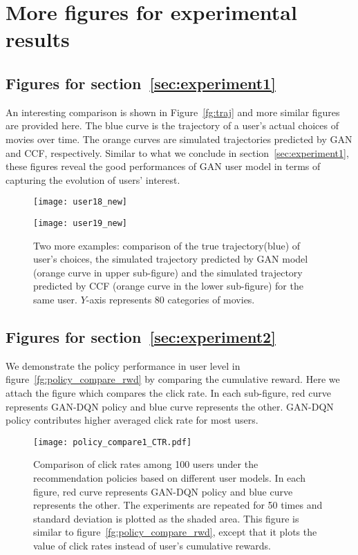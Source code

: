 \documentclass{article} %
\begin{document}
\section{More figures for experimental results}\label{app:experiment}
\subsection{Figures for section~\ref{sec:experiment1}}\label{app:exp_usermodel}
An interesting comparison is shown in Figure~\ref{fg:traj} and more similar figures are provided here. The blue curve is the trajectory of a user's actual choices of movies over time. The orange curves are simulated trajectories predicted by GAN and CCF, respectively. Similar to what we conclude in section~\ref{sec:experiment1}, these figures reveal the good performances of GAN user model in terms of capturing the evolution of users' interest.
\begin{figure}[htbp]
  \begin{minipage}[c]{0.47\textwidth}
    \centering
    \texttt{[image: user18\_new]}
  \end{minipage}\hfill
  \begin{minipage}[c]{0.52\textwidth}
    \centering
        \texttt{[image: user19\_new]}
  \end{minipage}
  \caption{\small Two more examples: comparison of the true trajectory(blue) of user's choices, the simulated trajectory predicted by GAN model (orange curve in upper sub-figure) and the simulated trajectory predicted by CCF (orange curve in the lower sub-figure) for the same user. $Y$-axis represents 80 categories of movies.
    }
\end{figure}


\subsection{Figures for section~\ref{sec:experiment2}}\label{app:exp_policy2}
 We demonstrate the policy performance in user level in figure~\ref{fg:policy_compare_rwd} by comparing the cumulative reward. Here we attach the figure which compares the click rate. In each sub-figure, red curve represents GAN-DQN policy and blue curve represents the other. GAN-DQN policy contributes higher averaged click rate for most users.
\begin{figure}[ht!]
\centering
\texttt{[image: policy\_compare1\_CTR.pdf]}
\caption{\small Comparison of click rates among 100 users under the recommendation policies based on different user models. In each figure, red curve represents GAN-DQN policy and blue curve represents the other. The experiments are repeated for 50 times and standard deviation is plotted as the shaded area. This figure is similar to figure~\ref{fg:policy_compare_rwd}, except that it plots the value of click rates instead of user's cumulative rewards.}
\end{figure}
\end{document}
